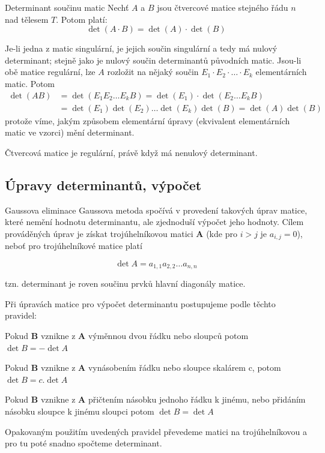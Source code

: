 \begin{vetaN}{Determinant součinu matic}
Nechť $A$ a $B$ jsou čtvercové matice stejného řádu $n$ nad tělesem $T$. Potom platí:
$$\det(A\cdot B)=\det(A)\cdot\det(B)$$

\begin{dukaz}
Je-li jedna z matic singulární, je jejich součin singulární a tedy má nulový determinant; stejně jako je nulový součin determinantů původních matic. Jsou-li obě matice regulární, lze $A$ rozložit na nějaký součin $E_1\cdot E_2\cdot\dots\cdot E_k$ elementárních matic. Potom 
\begin{align*}
\det(AB) & = \det(E_1E_2\dots E_k B)=\det(E_1)\cdot\det(E_2\dots E_k B)\\
& =\det(E_1)\det(E_2)\dots\det(E_k)\det(B)=\det(A)\det(B)
\end{align*}
protože víme, jakým způsobem elementární úpravy (ekvivalent elementárních matic ve vzorci) mění determinant.
\end{dukaz}
\end{vetaN}

\begin{dusledek}
Čtvercová matice je regulární, právě když má nenulový determinant.
\end{dusledek}

\subsection{Úpravy determinantů, výpočet}

\begin{obecne}{Gaussova eliminace}
Gaussova metoda spočívá v provedení takových úprav matice, které nemění hodnotu determinantu, ale zjednoduší výpočet jeho hodnoty. Cílem prováděných úprav je získat trojúhelníkovou matici \textbf{A} (kde pro $i > j$ je $a_{i,j} = 0$), neboť pro trojúhelníkové matice platí

$$\det A = a_{1,1} a_{2,2}  \dots  a_{n,n}$$

\noindent
tzn. determinant je roven součinu prvků hlavní diagonály matice.

\noindent
Při úpravách matice pro výpočet determinantu postupujeme podle těchto pravidel:
\begin{pitemize}
\item Pokud \textbf{B} vznikne z \textbf{A} výměnnou dvou řádku nebo sloupců potom $\det B = -\det A$
\item Pokud \textbf{B} vznikne z \textbf{A} vynásobením řádku nebo sloupce skalárem c, potom $\det B = c.\det A$
\item Pokud \textbf{B} vznikne z \textbf{A} přičtením násobku jednoho řádku k jinému, nebo přidáním násobku sloupce k jinému sloupci potom $\det B = \det A$
\end{pitemize}

\noindent
Opakovaným použitím uvedených pravidel převedeme matici na trojúhelníkovou a pro tu poté snadno spočteme determinant.
\end{obecne}



